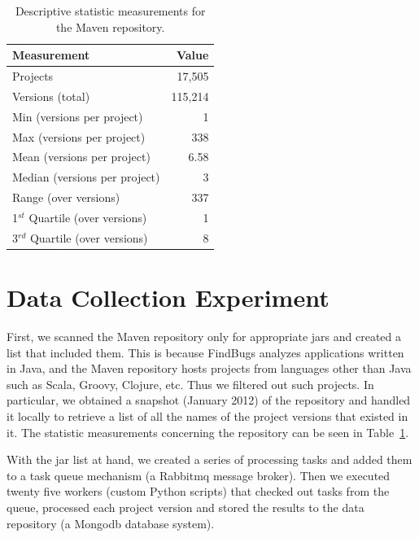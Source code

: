 \documentclass{sig-alternate}
\begin{document}
\begin{table}
\centering
\begin{tabular}{l r}
\hline
Measurement & Value\\
 \hline
Projects & 17,505\\
Versions (total) & 115,214\\
Min (versions per project) & 1\\
Max (versions per project) & 338\\
Mean (versions per project) & 6.58\\
Median (versions per project) & 3\\
Range (over versions) & 337\\
1$^{st}$ Quartile (over versions) & 1\\
3$^{rd}$ Quartile (over versions) & 8\\
\hline
\end{tabular}
\caption{Descriptive statistic measurements for the Maven repository.}
\label{tbl:repository}
\end{table}

\section{Data Collection Experiment}
\label{sec:exp}

First, we scanned the Maven repository only
for appropriate {\sc jar}s and created a list that included them.
This is because FindBugs analyzes applications written in Java,
and the Maven repository hosts projects from
languages other than Java such as Scala, Groovy,
Clojure, etc. Thus we filtered out such projects.
In particular, we obtained a snapshot (January 2012) of
the repository and handled it locally to retrieve a list of all
the names of the project versions that existed in it.
The statistic measurements concerning the repository can be seen in 
Table~\ref{tbl:repository}.

With the {\sc jar} list at hand, we created a series of processing tasks
and added them to a task queue mechanism (a Rabbit{\sc mq} message
broker). Then we executed twenty five workers (custom Python scripts)
that checked out tasks from the queue, processed each project version
and stored the results to the data
repository (a Mongo{\sc db} database system).
\end{document}
